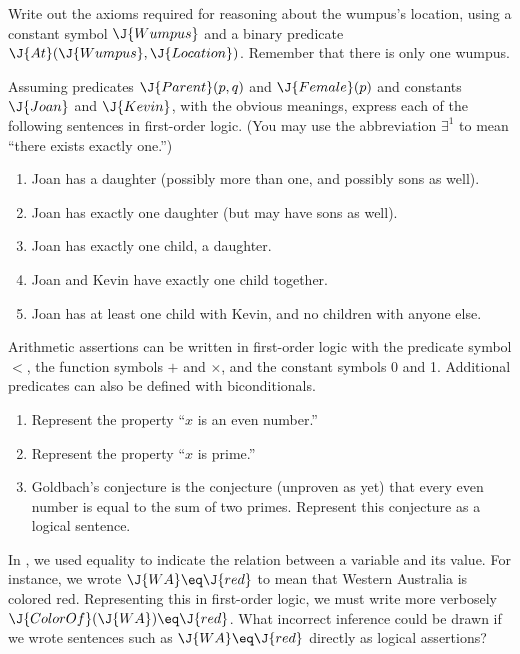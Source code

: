 \begin{exercise}
Write out the axioms required for reasoning about the wumpus's
location, using a constant symbol \(\J{Wumpus}\) and a binary predicate
\(\J{At}(\J{Wumpus}, \J{Location})\).  Remember that there is only one wumpus. 
\end{exercise} 

\begin{exercise}%
Assuming predicates \(\J{Parent}(p,q)\) and \(\J{Female}(p)\) and constants
\(\J{Joan}\) and \(\J{Kevin}\), with the obvious meanings, express each of the
following sentences in first-order logic.  (You may use the abbreviation
\(\exists^{1}\) to mean ``there exists exactly one.'')
\begin{enumerate}
\item Joan has a daughter (possibly more than one, and possibly sons as well).
\item Joan has exactly one daughter (but may have sons as well).
\item Joan has exactly one child, a daughter.
\item Joan and Kevin have exactly one child together.
\item Joan has at least one child with Kevin, and no children with anyone
else.
\end{enumerate}
\end{exercise} 

\begin{exercise}%
Arithmetic assertions can be written in first-order logic with the
predicate symbol \(<\), the function symbols \({+}\) and \({\times}\),
and the constant symbols 0 and 1. Additional predicates can also be
defined with biconditionals.
\begin{enumerate}
\item Represent the property ``\(x\) is an even number.''
\item Represent the property ``\(x\) is prime.''
\item Goldbach's conjecture is the conjecture (unproven as yet)
that every even number is equal to the sum of two primes.  Represent this conjecture as a logical sentence.
\end{enumerate}
\end{exercise} 

\begin{exercise}%
In , we used equality to indicate the relation between a variable and
its value.  For instance, we wrote \(\J{WA}\eq \J{red}\) to mean that Western
Australia is colored red. Representing this in first-order logic, we must
write more verbosely \(\J{ColorOf}(\J{WA})\eq \J{red}\).  What incorrect inference could
be drawn if we wrote sentences such as \(\J{WA}\eq \J{red}\) directly as logical assertions?
\end{exercise} 

